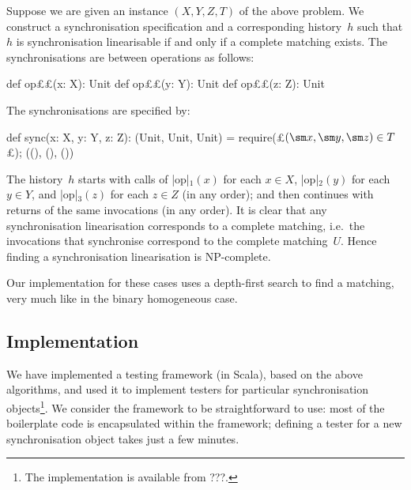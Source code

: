 Suppose we are given an instance $(X, Y, Z, T)$ of the above problem.  We
construct a synchronisation specification and a corresponding history~$h$ such
that $h$ is synchronisation linearisable if and only if a complete matching
exists.  The synchronisations are between operations as follows:
\begin{scala}
  def op££(x: X): Unit
  def op££(y: Y): Unit
  def op££(z: Z): Unit
\end{scala}
%
The synchronisations are specified by:
%
\begin{scala}
  def sync(x: X, y: Y, z: Z): (Unit, Unit, Unit) = {
    require(£$(\sm x, \sm y, \sm z) \in T$£); ((), (), ())
  }
\end{scala}
%
The history~$h$ starts with calls of |op|$_1(x)$ for each $x \in X$,
|op|$_2(y)$ for each $y \in Y$, and |op|$_3(z)$ for each $z \in Z$ (in any
order); and then continues with returns of the same invocations (in any
order).  It is clear that any synchronisation linearisation corresponds to a
complete matching, i.e.~the invocations that synchronise correspond to the
complete matching~$U$.  Hence finding a synchronisation linearisation is
NP-complete. 

Our implementation for these cases uses a depth-first search to find a
matching, very much like in the binary homogeneous case.


\subsection{Implementation}

We have implemented a testing framework (in Scala), based on the above
algorithms, and used it to implement testers for particular synchronisation
objects\footnote{The implementation is available from ???.}.  We consider the
framework to be straightforward to use: most of the boilerplate code is
encapsulated within the framework; defining a tester for a new synchronisation
object takes just a few minutes.


